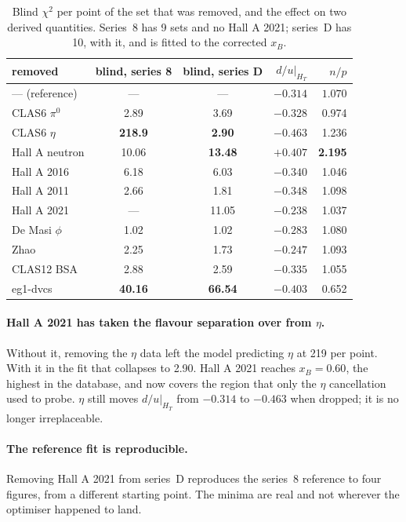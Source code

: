 \documentclass[11pt,a4paper]{article}
\begin{document}
\begin{table}[htb]
\centering\small
\caption{Blind $\chi^2$ per point of the set that was removed, and the effect
on two derived quantities.  Series~8 has 9 sets and no Hall A 2021; series~D has 10, with it, and is fitted to the corrected $x_B$.}
\label{tab:loo}
\begin{tabular}{lccrr}
\toprule
removed & blind, series 8 & blind, series D & $d/u|_{H_T}$ & $n/p$\\
\midrule
--- (reference) & --- & --- & $-0.314$ & $1.070$\\
CLAS6 $\pi^0$ & 2.89 & 3.69 & $-0.328$ & 0.974\\
CLAS6 $\eta$ & \textbf{218.9} & \textbf{2.90} & $-0.463$ & 1.236\\
Hall A neutron & 10.06 & \textbf{13.48} & $+0.407$ & \textbf{2.195}\\
Hall A 2016 & 6.18 & 6.03 & $-0.340$ & 1.046\\
Hall A 2011 & 2.66 & 1.81 & $-0.348$ & 1.098\\
Hall A 2021 & --- & 11.05 & $-0.238$ & 1.037\\
De Masi $\phi$ & 1.02 & 1.02 & $-0.283$ & 1.080\\
Zhao & 2.25 & 1.73 & $-0.247$ & 1.093\\
CLAS12 BSA & 2.88 & 2.59 & $-0.335$ & 1.055\\
eg1-dvcs & \textbf{40.16} & \textbf{66.54} & $-0.403$ & 0.652\\
\bottomrule
\end{tabular}
\end{table}

\paragraph{Hall A 2021 has taken the flavour separation over from $\eta$.}
Without it, removing the $\eta$ data left the model predicting $\eta$ at 219
per point.  With it in the fit that collapses to 2.90.  Hall A 2021 reaches
$x_B = 0.60$, the highest in the database, and now covers the region that only
the $\eta$ cancellation used to probe.  $\eta$ still moves $d/u|_{H_T}$ from
$-0.314$ to $-0.463$ when dropped; it is no longer irreplaceable.

\paragraph{The reference fit is reproducible.}  Removing Hall A 2021 from
series~D reproduces the series~8 reference to four figures, from a different
starting point.  The minima are real and not wherever the optimiser happened to
land.
\end{document}
